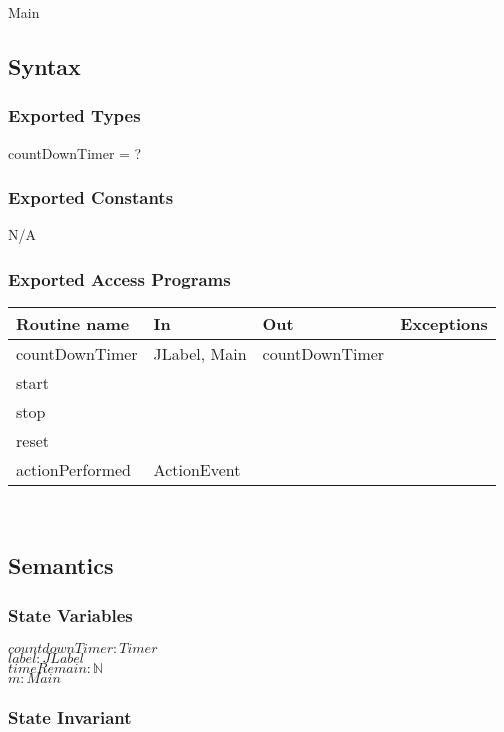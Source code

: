 \documentclass[12pt]{article}
\begin{document}
{Main

\subsection* {Syntax}

\subsubsection* {Exported Types}

countDownTimer = ?

\subsubsection* {Exported Constants}

N/A

\subsubsection* {Exported Access Programs}

\begin{tabular}{| l | l | l | p{5cm} |}
\hline
\textbf{Routine name} & \textbf{In} & \textbf{Out} & \textbf{Exceptions}\\
\hline
countDownTimer & JLabel, Main & countDownTimer & ~\\
\hline
start & ~ & ~ & ~\\
\hline
stop & ~ & ~ & ~\\
\hline
reset & ~ & ~ & ~\\
\hline
actionPerformed & ActionEvent & ~\\
\hline

\end{tabular}\\

\subsection* {Semantics}

\subsubsection* {State Variables}

$countdownTimer: Timer$\\
$label: JLabel$\\
$timeRemain: \mathbb{N}$\\
$m: Main$


\subsubsection* {State Invariant}

}
\end{document}
